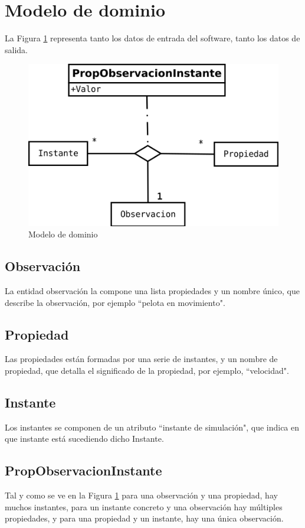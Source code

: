 \section{Modelo de dominio}
La Figura \ref{fig:ModelodeDominio} representa tanto los datos de entrada del software, tanto los datos
de salida.

\begin{figure}[H]
\centering
\includegraphics[width=0.7\linewidth]{./Figures/ModelodeDominio}
\caption[Modelo de dominio]{Modelo de dominio}
\label{fig:ModelodeDominio}
\end{figure}

\subsection{Observaci\'on}
La entidad observaci\'on la compone una lista propiedades y un nombre \'unico, que describe la observaci\'on,
por ejemplo ``pelota en movimiento".

\subsection{Propiedad}
Las propiedades est\'an formadas por una serie de instantes, y un nombre de propiedad, que detalla el
significado de la propiedad, por ejemplo, ``velocidad".

\subsection{Instante}
Los instantes se componen de un atributo ``instante de simulaci\'on", que indica en que instante est\'a sucediendo
dicho Instante.

\subsection{PropObservacionInstante}
Tal y como se ve en la Figura \ref{fig:ModelodeDominio} para una observaci\'on y una propiedad,
hay muchos instantes, para un instante concreto y una observaci\'on 
hay m\'ultiples propiedades, y para
una propiedad y un instante, hay una \'unica observaci\'on.

